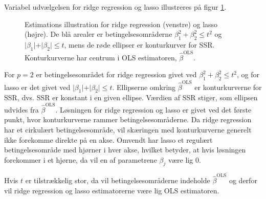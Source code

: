 Variabel udvælgelsen for ridge regression og lasso illustreres på figur \ref{fig:LassoRig}.
%
\begin{figure}[H]
\centering
\begin{minipage}{0.4\linewidth}
\scalebox{0.7}{}
\end{minipage}
\hspace{0.2cm}
\begin{minipage}{0.4\linewidth}
\scalebox{0.7}{}
\end{minipage}
\caption{Estimations illustration for ridge regression (venstre) og lasso (højre). 
De blå arealer er betingelsesområderne $\beta_1^2+\beta_2^2 \leq t^2$ og $\vert \beta_1 \vert+\vert \beta_2 \vert \leq t$, mens de røde ellipser er konturkurver for SSR. Konturkurverne har centrum i OLS estimatoren, $\hat{\beta}^\text{OLS}$.} \label{fig:LassoRig}
\end{figure}
%
For $p=2$ er betingelsesområdet for ridge regression givet ved $\beta_1^2 + \beta_2^2 \leq t^2$, og for lasso er det givet ved $\vert \beta_1 \vert + \vert \beta_2 \vert \leq t$.
Ellipserne omkring $\hat{\beta}^{\text{OLS}}$ er konturkurverne for SSR, dvs. SSR er konstant i en given ellipse. Værdien af SSR stiger, som ellipsen udvides fra $\hat{\beta}^{\text{OLS}}$.
Løsningen for ridge regression og lasso er givet ved det første punkt, hvor konturkurverne rammer betingelsesområderne.
Da ridge regression har et cirkulært betingelsesområde, vil skæringen med konturkurverne generelt ikke forekomme direkte på en akse.
Omvendt har lasso et regulært betingelsesområde med hjørner i hver akse, hvilket betyder, at hvis løsningen forekommer i et hjørne, da vil en af parametrene $\beta_j$ være lig 0.

Hvis $t$ er tilstrækkelig stor, da vil betingelsesområderne indeholde $\hat{\beta}^{\text{OLS}}$ og derfor vil ridge regression og lasso estimatorerne være lig OLS estimatoren.

